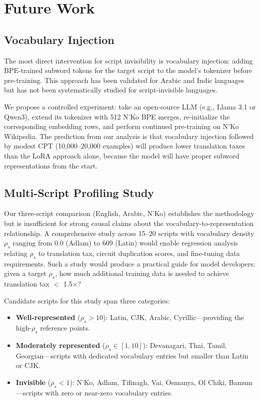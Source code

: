 \documentclass[11pt]{article}
\begin{document}
\section{Future Work}

\subsection{Vocabulary Injection}

The most direct intervention for script invisibility is vocabulary injection: adding BPE-trained subword tokens for the target script to the model's tokenizer before pre-training.
This approach has been validated for Arabic \cite{antoun2020arabert} and Indic languages \cite{kakwani2020indicnlpsuite} but has not been systematically studied for script-invisible languages.

We propose a controlled experiment: take an open-source LLM (e.g., Llama 3.1 or Qwen3), extend its tokenizer with 512 N'Ko BPE merges, re-initialize the corresponding embedding rows, and perform continued pre-training on N'Ko Wikipedia.
The prediction from our analysis is that vocabulary injection followed by modest CPT (10,000--20,000 examples) will produce lower translation taxes than the LoRA approach alone, because the model will have proper subword representations from the start.

\subsection{Multi-Script Profiling Study}

Our three-script comparison (English, Arabic, N'Ko) establishes the methodology but is insufficient for strong causal claims about the vocabulary-to-representation relationship.
A comprehensive study across 15--20 scripts with vocabulary density $\rho_s$ ranging from 0.0 (Adlam) to 609 (Latin) would enable regression analysis relating $\rho_s$ to translation tax, circuit duplication scores, and fine-tuning data requirements.
Such a study would produce a practical guide for model developers: given a target $\rho_s$, how much additional training data is needed to achieve translation tax $<$ 1.5$\times$?

Candidate scripts for this study span three categories:
\begin{itemize}
\item \textbf{Well-represented} ($\rho_s > 10$): Latin, CJK, Arabic, Cyrillic---providing the high-$\rho_s$ reference points.
\item \textbf{Moderately represented} ($\rho_s \in [1, 10]$): Devanagari, Thai, Tamil, Georgian---scripts with dedicated vocabulary entries but smaller than Latin or CJK.
\item \textbf{Invisible} ($\rho_s < 1$): N'Ko, Adlam, Tifinagh, Vai, Osmanya, Ol Chiki, Bamum---scripts with zero or near-zero vocabulary entries.
\end{itemize}
\end{document}
